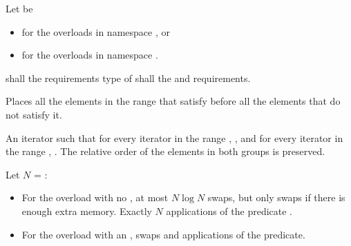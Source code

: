 \begin{itemdescr}
\begin{newnewblock}
\pnum
Let  be
\begin{itemize}
\item {} for the overloads in namespace , or
\item {} for the overloads in
  namespace .
\end{itemize}
\end{newnewblock}

\pnum
\requires
{}
 shall   the
 requirements  type of  shall 
 the
 and
 requirements.

\pnum
\effects
Places all the elements in the range
that satisfy   before all the
elements that do not satisfy it.

\pnum
\returns
An iterator
such that for every iterator
in the range
,
,
and for every iterator
in the range
,
.
The relative order of the elements in both groups is preserved.

\pnum
\complexity
Let $N$ = :
\begin{itemize}
\item For the overload with no ,
at most $N \log N$ swaps,
but only  swaps if there is enough extra memory.
Exactly $N$ applications of the predicate .
\item For the overload with an ,
 swaps and  applications of the predicate.
\end{itemize}
\end{itemdescr}

